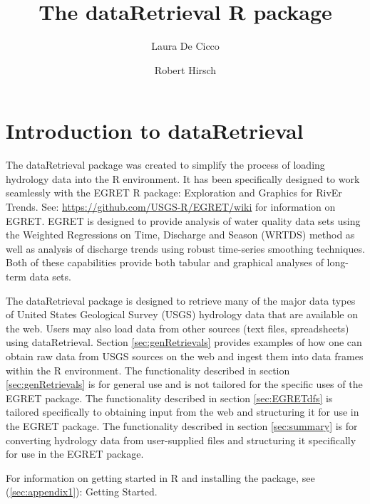 \documentclass[a4paper,11pt]{article}\usepackage[]{graphicx}\usepackage[]{color}
\begin{document}
\title{The dataRetrieval R package}
\author[1]{Laura De Cicco}
\author[1]{Robert Hirsch}






\maketitle
\tableofcontents

\section{Introduction to dataRetrieval}
The dataRetrieval package was created to simplify the process of loading hydrology data into the R environment. It has been specifically designed to work seamlessly with the EGRET R package: Exploration and Graphics for RivEr Trends. See: \url{https://github.com/USGS-R/EGRET/wiki} for information on EGRET. EGRET is designed to provide analysis of water quality data sets using the Weighted Regressions on Time, Discharge and Season (WRTDS) method as well as analysis of discharge trends using robust time-series smoothing techniques.  Both of these capabilities provide both tabular and graphical analyses of long-term data sets.


The dataRetrieval package is designed to retrieve many of the major data types of United States Geological Survey (USGS) hydrology data that are available on the web. Users may also load data from other sources (text files, spreadsheets) using dataRetrieval.  Section \ref{sec:genRetrievals} provides examples of how one can obtain raw data from USGS sources on the web and ingest them into data frames within the R environment.  The functionality described in section \ref{sec:genRetrievals} is for general use and is not tailored for the specific uses of the EGRET package.  The functionality described in section \ref{sec:EGRETdfs} is tailored specifically to obtaining input from the web and structuring it for use in the EGRET package.  The functionality described in section \ref{sec:summary} is for converting hydrology data from user-supplied files and structuring it specifically for use in the EGRET package.

For information on getting started in R and installing the package, see (\ref{sec:appendix1}): Getting Started.
\end{document}
